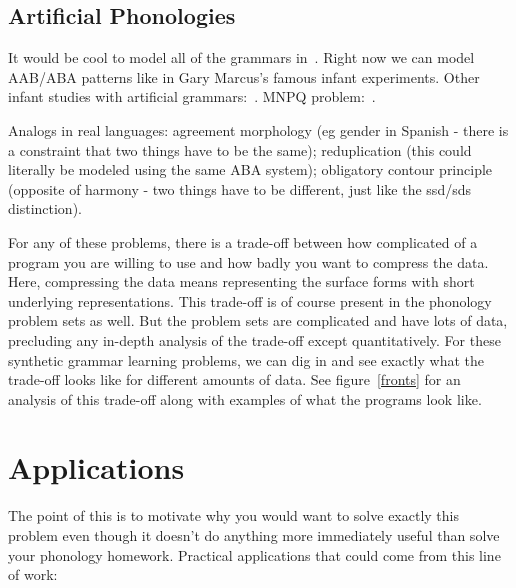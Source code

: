 \documentclass{article}
\begin{document}

\subsection{Artificial Phonologies}

It would be cool to model all of the grammars in~\cite{frank2011three}. Right now we can model AAB/ABA patterns like in Gary Marcus's famous infant experiments. Other infant studies with artificial grammars:~\cite{gerken2006decisions}. MNPQ problem:~\cite{smith1966grammatical}.

Analogs in real languages: agreement morphology (eg gender in Spanish
- there is a constraint that two things have to be the same);
reduplication (this could literally be modeled using the same ABA
system); obligatory contour principle (opposite of harmony - two
things have to be different, just like the ssd/sds distinction).

For any of these problems, there is a trade-off between how
complicated of a program you are willing to use and how badly you want
to compress the data. Here, compressing the data means representing
the surface forms with short underlying representations. This
trade-off is of course present in the phonology problem sets as well.
But the problem sets are complicated and have lots of data, precluding
any in-depth analysis of the trade-off except quantitatively. For
these synthetic grammar learning problems, we can dig in and see
exactly what the trade-off looks like for different amounts of data.
See figure~\ref{fronts} for an analysis of this trade-off along with
examples of what the programs look like.



\section{Applications}
The point of this is to motivate why you would want to solve exactly
this problem even though it doesn't do anything more immediately
useful than solve your phonology homework. Practical applications that could come from this line of work:
\end{document}
